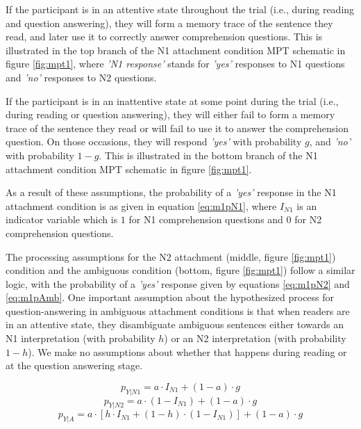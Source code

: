 \documentclass[11pt]{article}\usepackage[]{graphicx}\usepackage[]{color}
\begin{document}
If the participant is in an attentive state throughout the trial (i.e., during reading and question answering), they will form a memory trace of the sentence they read, and later use it to correctly answer comprehension questions. This is illustrated in the top branch of the N1 attachment condition MPT schematic in figure \ref{fig:mpt1}, where \textit{'N1 response'} stands for \textit{'yes'} responses to N1 questions and \textit{'no'} responses to N2 questions.

If the participant is in an inattentive state at some point during the trial (i.e., during reading or question answering), they will either fail to form a memory trace of the sentence they read or will fail to use it to answer the comprehension question. On those occasions, they will respond \textit{'yes'} with probability $g$, and \textit{'no'} with probability $1-g$. This is illustrated in the bottom branch of the N1 attachment condition MPT schematic in figure \ref{fig:mpt1}.
 
As a result of these assumptions, the probability of a \textit{'yes'} response in the N1 attachment condition is as given in equation \ref{eq:m1pN1}, where $I_{N1}$ is an indicator variable which is $1$ for N1 comprehension questions and $0$ for N2 comprehension questions. 

The processing assumptions for the N2 attachment (middle, figure \ref{fig:mpt1}) condition and the ambiguous condition  (bottom, figure \ref{fig:mpt1}) follow a similar logic, with the probability of a \textit{'yes'} response given by equations \ref{eq:m1pN2} and \ref{eq:m1pAmb}. One important assumption about the hypothesized process for question-answering in ambiguous attachment conditions is that when readers are in an attentive state, they disambiguate ambiguous sentences either towards an N1 interpretation (with probability $h$) or an N2 interpretation (with probability $1-h$). We make no assumptions about whether that happens during reading or at the question answering stage.

\begin{equation}
    p_{Y|N1} = a \cdot I_{N1} + (1-a) \cdot g
    \label{eq:m1pN1}
\end{equation}
\vspace{-0.5cm}
\begin{equation}
    p_{Y|N2} = a \cdot ( 1 - I_{N1} ) + (1-a) \cdot g
    \label{eq:m1pN2}
\end{equation}
\vspace{-0.8cm}
\begin{equation}
    p_{Y|A} = a \cdot   [ h  \cdot I_{N1} + (1 - h) \cdot (1-I_{N1}) ]  + (1-a) \cdot g 
    \label{eq:m1pAmb}
\end{equation}
\end{document}

